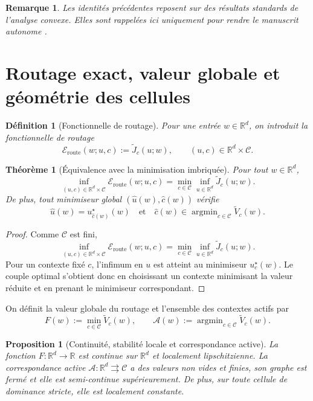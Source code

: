 \documentclass[11pt,a4paper]{article}
\newtheorem{definition}{Définition}[section]
\newtheorem{proposition}{Proposition}[section]
\newtheorem{theorem}{Théorème}[section]
\newtheorem{remark}{Remarque}[section]
\DeclareMathOperator{\argmin}{argmin}
\newcommand{\R}{\mathbb R}
\newcommand{\Ccal}{\mathcal C}
\newcommand{\Acal}{\mathcal A}
\begin{document}
\begin{remark}
Les identités précédentes reposent sur des résultats standards de l'analyse convexe. Elles sont rappelées ici uniquement pour rendre le manuscrit autonome \cite{Moreau1965,Rockafellar1970,BauschkeCombettes2017,RockafellarWets1998}.
\end{remark}

\section{Routage exact, valeur globale et géométrie des cellules}

\begin{definition}[Fonctionnelle de routage]
Pour une entrée \(w\in\R^d\), on introduit la fonctionnelle de routage
\[
\mathcal E_{\mathrm{route}}(w;u,c):=\widetilde J_c(u;w),
\qquad
(u,c)\in \R^d\times\Ccal.
\]
\end{definition}

\begin{theorem}[Équivalence avec la minimisation imbriquée]
Pour tout \(w\in\R^d\),
\[
\inf_{(u,c)\in \R^d\times\Ccal}\mathcal E_{\mathrm{route}}(w;u,c)
=
\min_{c\in\Ccal}\inf_{u\in\R^d}\widetilde J_c(u;w).
\]
De plus, tout minimiseur global \((\hat u(w),\hat c(w))\) vérifie
\[
\hat u(w)=u_{\hat c(w)}^\star(w)
\quad\text{et}\quad
\hat c(w)\in\argmin_{c\in\Ccal}\widetilde V_c(w).
\]
\end{theorem}

\begin{proof}
Comme \(\Ccal\) est fini,
\[
\inf_{(u,c)\in \R^d\times\Ccal}\mathcal E_{\mathrm{route}}(w;u,c)
=
\min_{c\in\Ccal}\inf_{u\in\R^d}\widetilde J_c(u;w).
\]
Pour un contexte fixé \(c\), l'infimum en \(u\) est atteint au minimiseur \(u_c^\star(w)\). Le couple optimal s'obtient donc en choisissant un contexte minimisant la valeur réduite et en prenant le minimiseur correspondant.
\end{proof}

On définit la valeur globale du routage et l'ensemble des contextes actifs par
\[
F(w):=\min_{c\in\Ccal}\widetilde V_c(w),
\qquad
\Acal(w):=\argmin_{c\in\Ccal}\widetilde V_c(w).
\]

\begin{proposition}[Continuité, stabilité locale et correspondance active]
La fonction \(F:\R^d\to\R\) est continue sur \(\R^d\) et localement lipschitzienne. La correspondance active \(\Acal:\R^d\rightrightarrows\Ccal\) a des valeurs non vides et finies, son graphe est fermé et elle est semi-continue supérieurement. De plus, sur toute cellule de dominance stricte, elle est localement constante.
\end{proposition}
\end{document}
